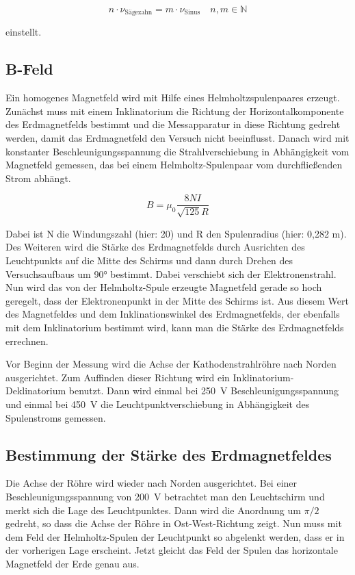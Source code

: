 \begin{equation}
\label{eq:Theorie_freqVerhältnis}
n \cdot \nu_\text{Sägezahn} = m \cdot \nu_\text{Sinus} \quad n, m\in\mathbb{N}
\end{equation}

einstellt.

\subsection{B-Feld}

Ein homogenes Magnetfeld wird mit Hilfe eines Helmholtzspulenpaares erzeugt. Zunächst muss
mit einem Inklinatorium die Richtung der Horizontalkomponente des Erdmagnetfelds bestimmt und die
Messapparatur in diese Richtung gedreht werden, damit das Erdmagnetfeld den Versuch nicht beeinflusst.
Danach wird mit konstanter Beschleunigungsspannung die Strahlverschiebung in Abhängigkeit vom Magnetfeld gemessen, das bei einem Helmholtz-Spulenpaar vom durchfließenden Strom abhängt.

\begin{equation}
\label{eq:Theorie_Magnetfeld}
B = \mu_0\frac{8 N I}{\sqrt{125}R}
\end{equation}

Dabei ist N die Windungszahl (hier: 20) und R den Spulenradius (hier: 0,282 m).
Des Weiteren wird die Stärke des Erdmagnetfelds durch Ausrichten des Leuchtpunkts auf die Mitte des Schirms und dann durch Drehen des Versuchsaufbaus um 90° bestimmt. Dabei verschiebt sich der Elektronenstrahl. Nun wird das von der Helmholtz-Spule erzeugte Magnetfeld
gerade so hoch geregelt, dass der Elektronenpunkt in der Mitte des Schirms ist. Aus diesem Wert des Magnetfeldes und dem Inklinationswinkel des Erdmagnetfelds, der ebenfalls mit dem Inklinatorium bestimmt wird, kann man die Stärke des Erdmagnetfelds errechnen.

Vor Beginn der Messung wird die Achse der Kathodenstrahlröhre nach
Norden ausgerichtet. Zum Auffinden dieser Richtung wird ein
Inklinatorium-Deklinatorium benutzt. Dann wird einmal bei
\SI{250}{\volt} Beschleunigungsspannung und einmal bei \SI{450}{\volt}
die Leuchtpunktverschiebung in Abhängigkeit des Spulenstroms gemessen.

\subsection{Bestimmung der Stärke des Erdmagnetfeldes}

Die Achse der Röhre wird wieder nach Norden ausgerichtet. Bei einer
Beschleunigungsspannung von \SI{200}{\volt} betrachtet man den
Leuchtschirm und merkt sich die Lage des Leuchtpunktes. Dann wird die
Anordnung um $\pi/2$ gedreht, so dass die Achse der Röhre in
Ost-West-Richtung zeigt. Nun muss mit dem Feld der
Helmholtz-Spulen der Leuchtpunkt so abgelenkt werden, dass er in
der vorherigen Lage erscheint. Jetzt gleicht das Feld der Spulen das
horizontale Magnetfeld der Erde genau aus.


